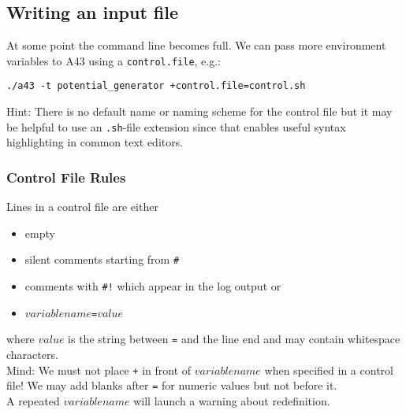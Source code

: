 \documentclass[oribibl]{llncs}
\newcommand{\ttt}[1]{\texttt{#1}}
\newcommand{\codename}{A43}
\begin{document}
%
\subsection{Writing an input file} \label{sec:control-file}
%
At some point the command line becomes full.
We can pass more environment variables to \codename{} using a \ttt{control.file}, e.g.:
\begin{verbatim}
./a43 -t potential_generator +control.file=control.sh
\end{verbatim}
Hint: There is no default name or naming scheme for the control file 
but it may be helpful to use an \ttt{.sh}-file extension since that
enables useful syntax highlighting in common text editors.
%
%

\subsubsection{Control File Rules} \label{sec:control-file-rules}
%
Lines in a control file are either 
\begin{itemize}
    \item empty
    \item silent comments starting from \ttt{\#}
    \item comments with \ttt{\#!} which appear in the log output or
    \item $variablename$\ttt{=}$value$
\end{itemize}
where $value$ is the string between \ttt{=} and the line end and may contain whitespace characters.
\\
Mind: We must not place \ttt{+} in front of $variablename$ when specified in a control file!
We may add blanks after \ttt{=} for numeric values but not before it.
\\
A repeated $variablename$ will launch a warning about redefinition.
%
%
\end{document}
